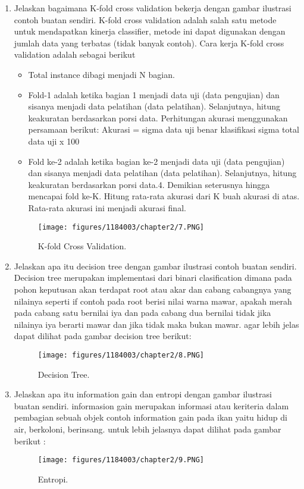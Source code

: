 \begin{enumerate}
	\item Jelaskan bagaimana K-fold cross validation bekerja dengan gambar ilustrasi contoh buatan sendiri.
	\hfill\break
	K-fold cross validation adalah salah satu metode untuk mendapatkan kinerja classifier, 
	metode ini dapat digunakan dengan jumlah data yang terbatas (tidak banyak contoh).
	Cara kerja K-fold cross validation adalah sebagai berikut
	\begin{itemize}
	\item Total instance dibagi menjadi N bagian.
		\item Fold-1 adalah ketika bagian 1 menjadi data uji (data pengujian) dan sisanya menjadi data pelatihan (data pelatihan).
		\hfill\break
		Selanjutnya, hitung keakuratan berdasarkan porsi data. Perhitungan akurasi menggunakan persamaan berikut:
		Akurasi = sigma data uji benar klasifikasi sigma total data uji x 100%
		\item Fold ke-2 adalah ketika bagian ke-2 menjadi data uji (data pengujian) dan sisanya menjadi data pelatihan (data pelatihan).
		\hfill\break
		Selanjutnya, hitung keakuratan berdasarkan porsi data.4. 
		Demikian seterusnya hingga mencapai fold ke-K. 
		Hitung rata-rata akurasi dari K buah akurasi di atas. 
		Rata-rata akurasi ini menjadi akurasi final.
	\end{itemize}

	\begin{figure}[h]
	\centering
		\texttt{[image: figures/1184003/chapter2/7.PNG]}
		\caption{K-fold Cross Validation.}
	\end{figure}

	\item Jelaskan apa itu decision tree dengan gambar ilustrasi contoh buatan sendiri.
	\hfill\break
	Decision tree merupakan implementasi dari binari clasification dimana pada pohon keputusan akan terdapat root atau akar dan cabang cabangnya yang nilainya seperti if contoh pada root berisi nilai warna mawar, apakah merah pada cabang satu bernilai iya dan pada cabang dua bernilai tidak jika nilainya iya berarti mawar dan jika tidak maka bukan mawar.
    agar lebih jelas dapat dilihat pada gambar decision tree berikut:

	\begin{figure}[h]
	\centering
		\texttt{[image: figures/1184003/chapter2/8.PNG]}
		\caption{Decision Tree.}
	\end{figure}

	\item Jelaskan apa itu information gain dan entropi dengan gambar ilustrasi buatan sendiri.
	\hfill\break
	informasion gain merupakan informasi atau keriteria dalam pembagian sebuah objek contoh information gain pada ikan yaitu hidup di air, berkoloni, berinsang. untuk lebih jelasnya dapat dilihat pada gambar berikut :
	\begin{figure}[h]
	\centering
		\texttt{[image: figures/1184003/chapter2/9.PNG]}
		\caption{Entropi.}
	\end{figure}


\end{enumerate}


